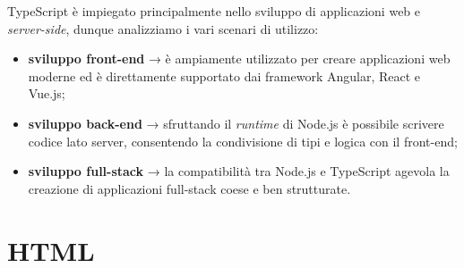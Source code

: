 TypeScript è impiegato principalmente nello sviluppo di applicazioni web e \textit{server-side}, dunque analizziamo i vari scenari di utilizzo:
\begin{itemize}
    \item \textbf{sviluppo front-end} → è ampiamente utilizzato per creare applicazioni web moderne ed è direttamente supportato dai framework Angular, React e Vue.js;
    \item \textbf{sviluppo back-end} → sfruttando il \textit{runtime} di Node.js è possibile scrivere codice lato server, consentendo la condivisione di tipi e logica con il front-end;
    \item \textbf{sviluppo full-stack} → la compatibilità tra Node.js e TypeScript agevola la creazione di applicazioni full-stack coese e ben strutturate.
\end{itemize}


\section{HTML}

